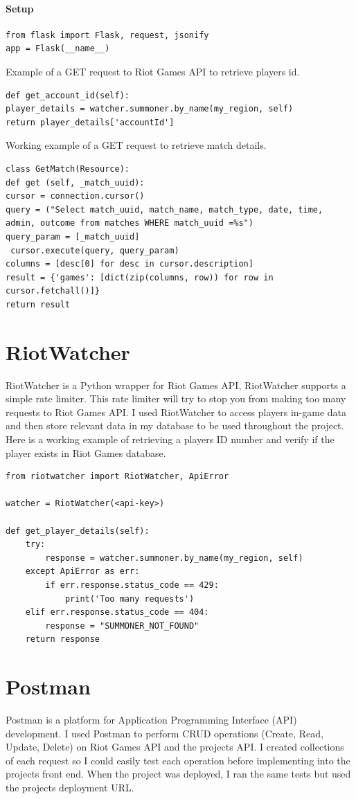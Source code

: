 \paragraph{Setup}
\begin{verbatim}
from flask import Flask, request, jsonify
app = Flask(__name__)
\end{verbatim}

Example of a GET request to Riot Games API to retrieve players id.
\begin{verbatim}
def get_account_id(self):
player_details = watcher.summoner.by_name(my_region, self)
return player_details['accountId']
\end{verbatim}
\newpage
Working example of a GET request to retrieve match details.
\begin{verbatim}
class GetMatch(Resource):
def get (self, _match_uuid):
cursor = connection.cursor()
query = ("Select match_uuid, match_name, match_type, date, time, admin, outcome from matches WHERE match_uuid =%s")
query_param = [_match_uuid]
 cursor.execute(query, query_param)
columns = [desc[0] for desc in cursor.description]
result = {'games': [dict(zip(columns, row)) for row in cursor.fetchall()]}
return result
\end{verbatim}


\section{RiotWatcher}
RiotWatcher is a Python wrapper for Riot Games API, RiotWatcher supports a simple rate limiter. This \cite{dealcisco} rate limiter will try to stop you from making too many requests to Riot Games API. I used RiotWatcher to access players in-game data and then store relevant data in my database to be used throughout the project. Here is a working example of retrieving a players ID number and verify if the player exists in Riot Games database.
\begin{verbatim}
from riotwatcher import RiotWatcher, ApiError

watcher = RiotWatcher(<api-key>)

def get_player_details(self):
	try:
		response = watcher.summoner.by_name(my_region, self)
	except ApiError as err:
		if err.response.status_code == 429:
			print('Too many requests')
	elif err.response.status_code == 404:
		response = "SUMMONER_NOT_FOUND"
	return response
\end{verbatim}
\newpage
\section{Postman}
Postman \cite{postman} is a platform for Application Programming Interface (API) development. I used Postman to perform CRUD operations (Create, Read, Update, Delete) on Riot Games API and the projects API. I created collections of each request so I could easily test each operation before implementing into the projects front end. When the project was deployed, I ran the same tests but used the projects deployment URL.
